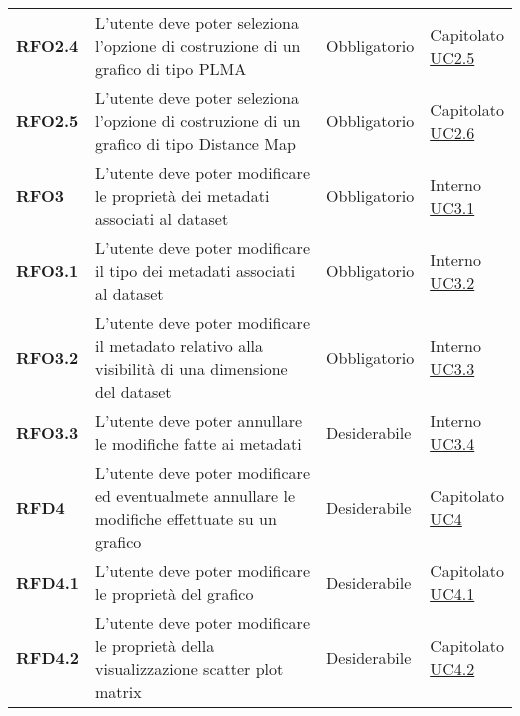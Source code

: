 \begin{longtable}[H]{>{\raggedright\bfseries}m{20mm} >{\raggedright}m{90mm} >{\raggedright}m{28mm} >{\raggedright\arraybackslash}m{30mm}}
    RFO2.4
    & L'utente deve poter seleziona l'opzione di costruzione di un grafico di tipo PLMA
    & Obbligatorio
    & \makecell{Capitolato \\ \hyperref[ssub:uc2.5]{UC2.5}}\\

    RFO2.5
    & L'utente deve poter seleziona l'opzione di costruzione di un grafico di tipo Distance Map
    & Obbligatorio
    & \makecell{Capitolato \\ \hyperref[ssub:UC2.6]{UC2.6}}\\

    RFO3
    & L'utente deve poter modificare le proprietà dei metadati associati al dataset
    & Obbligatorio
    & \makecell{ Interno \\  \hyperref[ssub:uc3.1]{UC3.1} }\\

    RFO3.1
    & L'utente deve poter modificare il tipo dei metadati associati al dataset
    & Obbligatorio
    & \makecell{ Interno \\\hyperref[ssub:uc3.2]{UC3.2} }\\

    RFO3.2
    & L'utente deve poter modificare il metadato relativo alla visibilità di una dimensione del dataset
    & Obbligatorio
    & \makecell{ Interno \\  \hyperref[ssub:uc3.3]{UC3.3} }\\

    RFO3.3
    & L'utente deve poter annullare le modifiche fatte ai metadati
    & Desiderabile
    & \makecell{ Interno \\  \hyperref[ssub:uc3.4]{UC3.4} }\\

    RFD4
    & L'utente deve poter modificare ed eventualmete annullare le modifiche effettuate su un grafico
    & Desiderabile
    & \makecell{ Capitolato \\ \hyperref[sub:uc4]{UC4} }\\

    RFD4.1
    & L'utente deve poter modificare le proprietà del grafico
    & Desiderabile
    & \makecell{ Capitolato \\ \hyperref[ssub:uc4.1]{UC4.1} }\\

    RFD4.2
    & L'utente deve poter modificare le proprietà della visualizzazione scatter plot matrix
    & Desiderabile
    & \makecell{ Capitolato \\ \hyperref[ssub:uc4.2]{UC4.2} }\\


\end{longtable}
